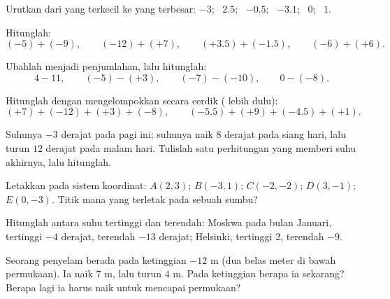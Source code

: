 \begin{exercise}[$\star$]\label{exo:g7:negatives:3}
Urutkan dari yang terkecil ke yang terbesar: $-3$; \ $2.5$; \ $-0.5$; \ $-3.1$;
\ $0$; \ $1$.
\end{exercise}

\begin{exercise}[$\star$]\label{exo:g7:negatives:4}
Hitunglah:
\[
(-5) + (-9), \qquad
(-12) + (+7), \qquad
(+3.5) + (-1.5), \qquad
(-6) + (+6).
\]
\end{exercise}

\begin{exercise}[$\star$]\label{exo:g7:negatives:5}
Ubahlah menjadi penjumlahan, lalu hitunglah:
\[
4 - 11, \qquad
(-5) - (+3), \qquad
(-7) - (-10), \qquad
0 - (-8).
\]
\end{exercise}

\begin{exercise}[$\star$]\label{exo:g7:negatives:6}
Hitunglah dengan mengelompokkan secara cerdik ( lebih dulu):
\[
(+7) + (-12) + (+3) + (-8), \qquad
(-5.5) + (+9) + (-4.5) + (+1).
\]
\end{exercise}

\begin{exercise}[$\star$]\label{exo:g7:negatives:7}
Suhunya $-3$ derajat pada pagi ini; suhunya naik $8$ derajat pada
siang hari, lalu turun $12$ derajat pada malam hari. Tulislah satu
perhitungan yang memberi suhu akhirnya, lalu hitunglah.
\end{exercise}

\begin{exercise}[$\star$]\label{exo:g7:negatives:8}
Letakkan pada sistem koordinat: $A(2, 3)$; $B(-3, 1)$; $C(-2, -2)$;
$D(3, -1)$; $E(0, -3)$. Titik mana yang terletak pada sebuah sumbu?
\end{exercise}

\begin{exercise}[$\star\star$]\label{exo:g7:negatives:9}
Hitunglah  antara suhu tertinggi dan terendah: Moskwa pada
bulan Januari, tertinggi $-4$ derajat, terendah $-13$ derajat;
Helsinki, tertinggi $2$, terendah $-9$.
\end{exercise}

\begin{exercise}[$\star\star$]\label{exo:g7:negatives:10}
Seorang penyelam berada pada ketinggian $-12$ m (dua belas meter di
bawah permukaan). Ia naik $7$ m, lalu turun $4$ m. Pada ketinggian
berapa ia sekarang? Berapa lagi ia harus naik untuk mencapai permukaan?
\end{exercise}

